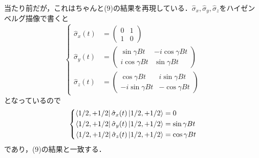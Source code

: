 \documentclass[a4paper,pdflatex,ja=standard]{bxjsarticle}
\begin{document}
\begin{enumerate}
  当たり前だが，これはちゃんと(9)の結果を再現している．$\hat{\sigma}_{x},\hat{\sigma}_{y},\hat{\sigma}_{z}$をハイゼンベルグ描像で書くと
  \begin{equation}
    \left\{
      \begin{alignedat}{1}
        \hat{\sigma}_{x}(t)
        &=
        \begin{pmatrix}
          0 & 1 \\
          1 & 0
        \end{pmatrix}
        \\
        \hat{\sigma}_{y}(t)
        &=
        \begin{pmatrix}
          \sin \gamma Bt & -i\cos \gamma Bt \\
          i\cos \gamma Bt & \sin \gamma Bt
        \end{pmatrix}
        \\
        \hat{\sigma}_{z}(t)
        &=
        \begin{pmatrix}
          \cos \gamma Bt & i\sin\gamma Bt \\
          -i\sin\gamma Bt & -\cos\gamma Bt
        \end{pmatrix}
      \end{alignedat}
    \right.
  \end{equation}
  となっているので
  \begin{equation}
    \left\{
      \begin{alignedat}{1}
        \bra{1/2,+1/2}\hat{\sigma}_{x}(t)\ket{1/2,+1/2}
        &=
        0
        \\
        \bra{1/2,+1/2}\hat{\sigma}_{y}(t)\ket{1/2,+1/2}
        &=
        \sin\gamma Bt
        \\
        \bra{1/2,+1/2}\hat{\sigma}_{z}(t)\ket{1/2,+1/2}
        &=
        \cos \gamma Bt
      \end{alignedat}
    \right.
  \end{equation}
  であり，(9)の結果と一致する．

\end{enumerate}
\end{document}

